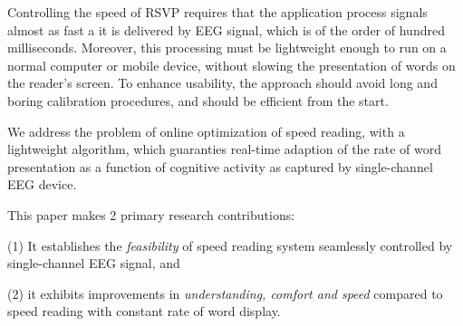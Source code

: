 Controlling the speed of RSVP requires that the application process signals almost as fast a it is delivered by EEG signal, which is of the order of hundred milliseconds. Moreover, this processing must be lightweight enough to run on a normal computer or mobile device, without slowing the presentation of words on the reader's screen. To enhance usability, the approach should avoid long and boring calibration procedures, and should be efficient from the start.

We address the problem of online optimization of speed reading, with a lightweight algorithm, which guaranties real-time adaption of the rate of word presentation as a function of cognitive activity as captured by single-channel EEG device.

This paper makes 2 primary research contributions: 

(1) It establishes the {\it feasibility} of speed reading system seamlessly controlled by single-channel EEG signal, and 

(2) it exhibits improvements in {\it understanding, comfort and speed} compared to speed reading with constant rate of word display.


